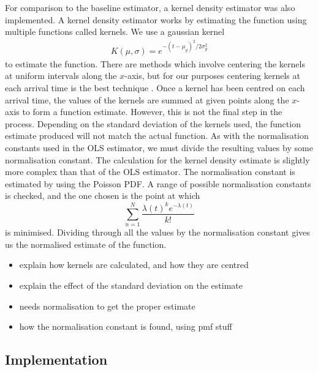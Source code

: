 \documentclass[a4paper,11pt]{article}
\begin{document}
For comparison to the baseline estimator, a kernel density estimator was also
implemented. A kernel density estimator works by estimating the function using
multiple functions called kernels. We use a gaussian kernel 
\begin{align}
K(\mu,\sigma)=e^{-(t-\mu_g)^2/2\sigma_g^2}
\end{align}
to estimate the function. There are methods which involve centering the kernels
at uniform intervals along the $x$-axis, but for our purposes centering kernels at
each arrival time is the best technique \cite{cuevas2006accurate}. Once a kernel
has been centred on each arrival time, the values of the kernels are summed at
given points along the $x$-axis to form a function estimate. However, this is not
the final step in the process. Depending on the standard deviation of the
kernels used, the function estimate produced will not match the actual
function. As with the normalisation constants used in the OLS estimator, we must
divide the resulting values by some normalisation constant. The calculation for
the kernel density estimate is slightly more complex than that of the OLS
estimator. The normalisation constant is estimated by using the Poisson PDF. A
range of possible normalisation constants is checked, and the one chosen is the
point at which
\begin{equation}
\sum_{n=1}^N\frac{\lambda(t)^ke^{-\lambda(t)}}{k!}
\end{equation}
is minimised. Dividing through all the values by the normalisation constant
gives us the normalised estimate of the function.
\begin{itemize}
\item explain how kernels are calculated, and how they are centred
\item explain the effect of the standard deviation on the estimate
\item needs normalisation to get the proper estimate
\item how the normalisation constant is found, using pmf stuff
\end{itemize}
\subsection{Implementation}
\label{sec-6-3}
\end{document}

